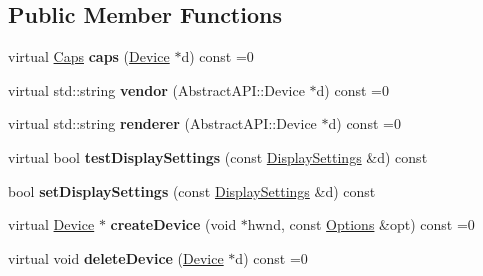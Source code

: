 \subsection*{Public Member Functions}
\begin{DoxyCompactItemize}
\item 
\hypertarget{class_tempest_1_1_abstract_a_p_i_ae20a6283cdebdf7d18bced2545bce436}{virtual \hyperlink{struct_tempest_1_1_abstract_a_p_i_1_1_caps}{Caps} {\bfseries caps} (\hyperlink{class_tempest_1_1_device}{Device} $\ast$d) const =0}\label{class_tempest_1_1_abstract_a_p_i_ae20a6283cdebdf7d18bced2545bce436}

\item 
\hypertarget{class_tempest_1_1_abstract_a_p_i_aafc6504fc8feda65b8701f28e2cffe4d}{virtual std\+::string {\bfseries vendor} (Abstract\+A\+P\+I\+::\+Device $\ast$d) const =0}\label{class_tempest_1_1_abstract_a_p_i_aafc6504fc8feda65b8701f28e2cffe4d}

\item 
\hypertarget{class_tempest_1_1_abstract_a_p_i_a2fd9c3d74ea1e5f9e7a6ed63de8cd486}{virtual std\+::string {\bfseries renderer} (Abstract\+A\+P\+I\+::\+Device $\ast$d) const =0}\label{class_tempest_1_1_abstract_a_p_i_a2fd9c3d74ea1e5f9e7a6ed63de8cd486}

\item 
\hypertarget{class_tempest_1_1_abstract_a_p_i_a58aa6ddf621445ddc81c78efba3b0268}{virtual bool {\bfseries test\+Display\+Settings} (const \hyperlink{class_tempest_1_1_display_settings}{Display\+Settings} \&d) const }\label{class_tempest_1_1_abstract_a_p_i_a58aa6ddf621445ddc81c78efba3b0268}

\item 
\hypertarget{class_tempest_1_1_abstract_a_p_i_aa2701ff138a25d99dec5af40498e7c19}{bool {\bfseries set\+Display\+Settings} (const \hyperlink{class_tempest_1_1_display_settings}{Display\+Settings} \&d) const }\label{class_tempest_1_1_abstract_a_p_i_aa2701ff138a25d99dec5af40498e7c19}

\item 
\hypertarget{class_tempest_1_1_abstract_a_p_i_ab35df327428760701a1cab83e818c40b}{virtual \hyperlink{class_tempest_1_1_device}{Device} $\ast$ {\bfseries create\+Device} (void $\ast$hwnd, const \hyperlink{struct_tempest_1_1_abstract_a_p_i_1_1_options}{Options} \&opt) const =0}\label{class_tempest_1_1_abstract_a_p_i_ab35df327428760701a1cab83e818c40b}

\item 
\hypertarget{class_tempest_1_1_abstract_a_p_i_a7daa4b8a59155e343aed3fea2aad93e6}{virtual void {\bfseries delete\+Device} (\hyperlink{class_tempest_1_1_device}{Device} $\ast$d) const =0}\label{class_tempest_1_1_abstract_a_p_i_a7daa4b8a59155e343aed3fea2aad93e6}


\end{DoxyCompactItemize}
